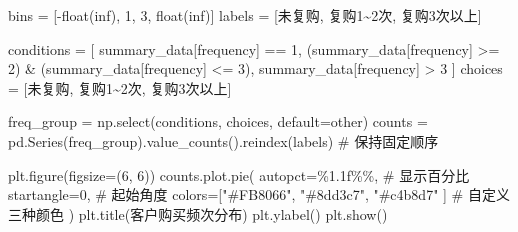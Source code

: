 \documentclass[
]{ctexart}
\newenvironment{Shaded}{\begin{snugshade}}{\end{snugshade}}
\newcommand{\BuiltInTok}[1]{\textcolor[rgb]{0.00,0.23,0.31}{#1}}
\newcommand{\CommentTok}[1]{\textcolor[rgb]{0.37,0.37,0.37}{#1}}
\newcommand{\DecValTok}[1]{\textcolor[rgb]{0.68,0.00,0.00}{#1}}
\newcommand{\NormalTok}[1]{\textcolor[rgb]{0.00,0.23,0.31}{#1}}
\newcommand{\OperatorTok}[1]{\textcolor[rgb]{0.37,0.37,0.37}{#1}}
\newcommand{\SpecialCharTok}[1]{\textcolor[rgb]{0.37,0.37,0.37}{#1}}
\newcommand{\StringTok}[1]{\textcolor[rgb]{0.13,0.47,0.30}{#1}}
\begin{document}
\begin{Shaded}
\begin{Highlighting}[]

\NormalTok{bins }\OperatorTok{=}\NormalTok{ [}\OperatorTok{{-}}\BuiltInTok{float}\NormalTok{(}\StringTok{\textquotesingle{}inf\textquotesingle{}}\NormalTok{), }\DecValTok{1}\NormalTok{, }\DecValTok{3}\NormalTok{, }\BuiltInTok{float}\NormalTok{(}\StringTok{\textquotesingle{}inf\textquotesingle{}}\NormalTok{)]}
\NormalTok{labels }\OperatorTok{=}\NormalTok{ [}\StringTok{\textquotesingle{}未复购\textquotesingle{}}\NormalTok{, }\StringTok{\textquotesingle{}复购1\textasciitilde{}2次\textquotesingle{}}\NormalTok{, }\StringTok{\textquotesingle{}复购3次以上\textquotesingle{}}\NormalTok{]}


\NormalTok{conditions }\OperatorTok{=}\NormalTok{ [}
\NormalTok{    summary\_data[}\StringTok{\textquotesingle{}frequency\textquotesingle{}}\NormalTok{] }\OperatorTok{==} \DecValTok{1}\NormalTok{,}
\NormalTok{    (summary\_data[}\StringTok{\textquotesingle{}frequency\textquotesingle{}}\NormalTok{] }\OperatorTok{\textgreater{}=} \DecValTok{2}\NormalTok{) }\OperatorTok{\&}\NormalTok{ (summary\_data[}\StringTok{\textquotesingle{}frequency\textquotesingle{}}\NormalTok{] }\OperatorTok{\textless{}=} \DecValTok{3}\NormalTok{),}
\NormalTok{    summary\_data[}\StringTok{\textquotesingle{}frequency\textquotesingle{}}\NormalTok{] }\OperatorTok{\textgreater{}} \DecValTok{3}
\NormalTok{]}
\NormalTok{choices }\OperatorTok{=}\NormalTok{ [}\StringTok{\textquotesingle{}未复购\textquotesingle{}}\NormalTok{, }\StringTok{\textquotesingle{}复购1\textasciitilde{}2次\textquotesingle{}}\NormalTok{, }\StringTok{\textquotesingle{}复购3次以上\textquotesingle{}}\NormalTok{]}

\NormalTok{freq\_group }\OperatorTok{=}\NormalTok{ np.select(conditions, choices, default}\OperatorTok{=}\StringTok{\textquotesingle{}other\textquotesingle{}}\NormalTok{)}
\NormalTok{counts }\OperatorTok{=}\NormalTok{ pd.Series(freq\_group).value\_counts().reindex(labels) }\CommentTok{\# 保持固定顺序}

\NormalTok{plt.figure(figsize}\OperatorTok{=}\NormalTok{(}\DecValTok{6}\NormalTok{, }\DecValTok{6}\NormalTok{))}
\NormalTok{counts.plot.pie(}
\NormalTok{    autopct}\OperatorTok{=}\StringTok{\textquotesingle{}}\SpecialCharTok{\%1.1f\%\%}\StringTok{\textquotesingle{}}\NormalTok{,              }\CommentTok{\# 显示百分比}
\NormalTok{    startangle}\OperatorTok{=}\DecValTok{0}\NormalTok{,                  }\CommentTok{\# 起始角度}
\NormalTok{    colors}\OperatorTok{=}\NormalTok{[}\StringTok{"\#FB8066"}\NormalTok{, }\StringTok{"\#8dd3c7"}\NormalTok{, }\StringTok{"\#c4b8d7"}
\NormalTok{    ] }\CommentTok{\# 自定义三种颜色}
\NormalTok{)}
\NormalTok{plt.title(}\StringTok{\textquotesingle{}客户购买频次分布\textquotesingle{}}\NormalTok{)}
\NormalTok{plt.ylabel(}\StringTok{\textquotesingle{}\textquotesingle{}}\NormalTok{) }
\NormalTok{plt.show()}


\end{Highlighting}
\end{Shaded}
\end{document}
